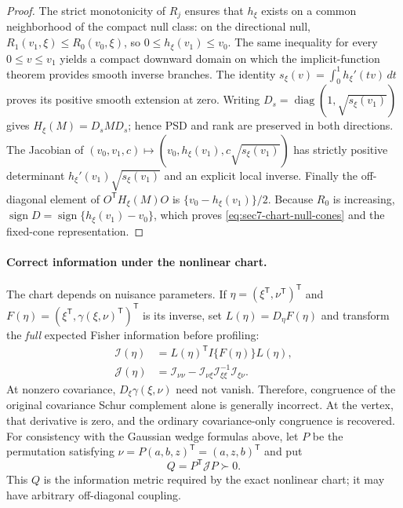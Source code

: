 \begin{proof}
The strict monotonicity of $R_j$ ensures that $h_\xi$ exists
on a common neighborhood of the compact null class: on the
directional null,
$R_1(v_1,\xi)\le R_0(v_0,\xi)$, so
$0\le h_\xi(v_1)\le v_0$. The same inequality for every
$0\le v\le v_1$ yields a compact downward domain on which
the implicit-function theorem provides smooth inverse branches.
The identity
$s_\xi(v)=\int_0^1h_\xi'(tv)\,dt$ proves its positive smooth
extension at zero. Writing
$D_s=\operatorname{diag}(1,\sqrt{s_\xi(v_1)})$ gives
$H_\xi(M)=D_s M D_s$; hence PSD and rank are preserved in
both directions. The Jacobian of
$(v_0,v_1,c)\mapsto(v_0,h_\xi(v_1),c\sqrt{s_\xi(v_1)})$
has strictly positive determinant
$h_\xi'(v_1)\sqrt{s_\xi(v_1)}$ and an explicit local inverse.
Finally the off-diagonal element of $O^{\mathsf T}H_\xi(M)O$
is $\{v_0-h_\xi(v_1)\}/2$. Because $R_0$ is increasing,
$\operatorname{sign}D=\operatorname{sign}\{h_\xi(v_1)-v_0\}$,
which proves \eqref{eq:sec7-chart-null-cones} and the
fixed-cone representation.
\end{proof}

\paragraph{Correct information under the nonlinear chart.}
The chart depends on nuisance parameters. If
$\eta=(\xi^{\mathsf T},\nu^{\mathsf T})^{\mathsf T}$ and
$F(\eta)=(\xi^{\mathsf T},\gamma(\xi,\nu)^{\mathsf T})^{\mathsf T}$
is its inverse, set $L(\eta)=D_\eta F(\eta)$ and transform the
\emph{full} expected Fisher information before profiling:
\begin{equation}\label{eq:sec7-transform-full-info}
 \begin{aligned}
 \mathcal I(\eta)&=L(\eta)^{\mathsf T}I\{F(\eta)\}L(\eta),\\
 \mathcal J(\eta)&=\mathcal I_{\nu\nu}-
 \mathcal I_{\nu\xi}\mathcal I_{\xi\xi}^{-1}
 \mathcal I_{\xi\nu}.
 \end{aligned}
\end{equation}
At nonzero covariance, $D_\xi\gamma(\xi,\nu)$ need not vanish.
Therefore, congruence of the original covariance Schur complement
alone is generally incorrect. At the vertex, that derivative is zero,
and the ordinary covariance-only congruence is recovered.
For consistency with the Gaussian wedge formulas above, let
$P$ be the permutation satisfying
$\nu=P(a,b,z)^{\mathsf T}=(a,z,b)^{\mathsf T}$ and put
\begin{equation}\label{eq:sec7-chart-Q}
 Q=P^{\mathsf T}\mathcal J P\succ0.
\end{equation}
This $Q$ is the information metric required by the exact
nonlinear chart; it may have arbitrary off-diagonal coupling.


